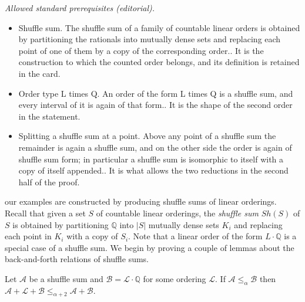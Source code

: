\documentclass[10pt,a4paper]{amsart}
\providecommand{\A}{\mathcal{A}}
\providecommand{\L}{\mathcal{L}}
\providecommand{\B}{\mathcal{B}}
\newcommand{\Q}{\mathbb{Q}}
\renewcommand{\L}{\mathcal{L}}
\begin{document}
\noindent\textit{Allowed standard prerequisites (editorial).}\begin{itemize}
\item Shuffle sum. The shuffle sum of a family of countable linear orders is obtained by partitioning the rationals into mutually dense sets and replacing each point of one of them by a copy of the corresponding order.. It is the construction to which the counted order belongs, and its definition is retained in the card.
\item Order type L times Q. An order of the form L times Q is a shuffle sum, and every interval of it is again of that form.. It is the shape of the second order in the statement.
\item Splitting a shuffle sum at a point. Above any point of a shuffle sum the remainder is again a shuffle sum, and on the other side the order is again of shuffle sum form; in particular a shuffle sum is isomorphic to itself with a copy of itself appended.. It is what allows the two reductions in the second half of the proof.
\end{itemize}\medskip
our examples are constructed by producing shuffle sums of linear orderings.
Recall that given a set $S$ of countable linear orderings, the \emph{shuffle
sum} $Sh(S)$ of $S$ is obtained by partitioning $\Q$ into $|S|$ mutually dense
sets $K_i$ and replacing each point in $K_i$ with a copy of $S_i$.
Note that a linear order of the form $L\cdot\Q$ is a special case of a shuffle
sum. We begin by proving a couple of lemmas about the back-and-forth relations
of shuffle sums.


\begin{lemma}\label{lem:shufflesum}
Let $\A$ be a shuffle sum and $\B = \L\cdot\Q$ for some ordering $\L$. If
$\A\leq_\alpha \B$ then $\A+\L+\B\leq_{\alpha+2}\A+\B$.
\end{lemma}
\end{document}
